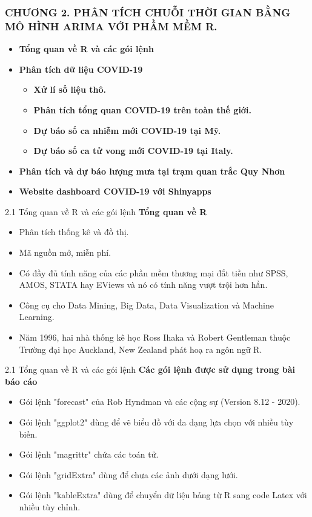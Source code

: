 \documentclass[notheorems,envcountsect,hyperref=unicode]{beamer}
\begin{document}
\begin{frame}
\frametitle{\MakeUppercase{\textsc\bf Chương 2. Phân tích chuỗi thời gian bằng mô hình ARIMA với phầm mềm R.}}
\renewcommand{\baselinestretch}{1.5}
\begin{itemize}
	\item[2.1] \textbf{Tổng quan về R và các gói lệnh} 
\item[2.2] \textbf{Phân tích dữ liệu COVID-19}
\begin{itemize}
	\item[2.2.1] \textbf{Xử lí số liệu thô.}
	\item[2.2.2] \textbf{Phân tích tổng quan COVID-19 trên toàn thế giới.}
	\item[2.2.3] \textbf{Dự báo số ca nhiễm mới COVID-19 tại Mỹ.}
	\item[2.2.4] \textbf{Dự báo số ca tử vong mới COVID-19 tại Italy.}  	  	
\end{itemize}
\item[2.3] \textbf{Phân tích và dự báo lượng mưa tại trạm quan trắc Quy Nhơn}
\item[2.4] \textbf{Website dashboard COVID-19 với Shinyapps}
\end{itemize}
\end{frame}

\begin{frame}{2.1 Tổng quan về R và các gói lệnh}
\textbf{Tổng quan về R}\\
\begin{itemize}
	\item Phân tích thống kê và đồ thị.
	\item Mã nguồn mở, miễn phí.
	\item Có đầy đủ tính năng của các phần mềm thương mại đắt tiền như SPSS, AMOS, STATA hay EViews và nó có tính năng vượt trội hơn hẳn.
	\item Công cụ cho Data Mining, Big Data, Data Visualization và Machine Learning.
	\item Năm 1996,  hai nhà thống kê học Ross Ihaka và Robert Gentleman thuộc Trường đại học Auckland, New Zealand phát hoạ ra ngôn ngữ R.
\end{itemize}
\end{frame}

\begin{frame}{2.1 Tổng quan về R và các gói lệnh}
\textbf{Các gói lệnh được sử dụng trong bài báo cáo}\\
\begin{itemize}
	\item Gói lệnh "forecast" của Rob Hyndman và các cộng sự (Version 8.12 - 2020).
	\item Gói lệnh "ggplot2" dùng để vẽ biểu đồ với đa dạng lựa chọn với nhiều tùy biến.
	\item Gói lệnh "magrittr" chứa các toán tử.
	\item Gói lệnh "gridExtra" dùng để chưa các ảnh dưới dạng lưới.
	\item Gói lệnh "kableExtra" dùng để chuyển dữ liệu bảng từ R sang code Latex với nhiều tùy chỉnh.
\end{itemize}
\end{frame}
\end{document}
